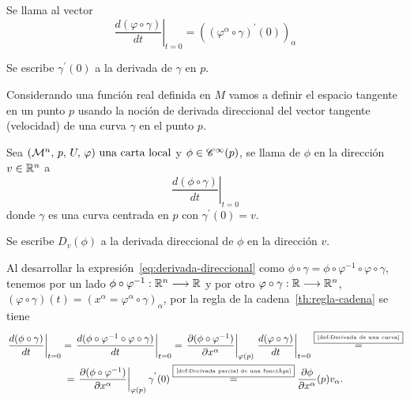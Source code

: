 \begin{definition}
  Se llama  al vector
  \begin{equation}
    \label{eq:derivada-curva}
    \left.\frac{d(\varphi\circ\gamma)
    }{dt}\right|_{t=0}=((\varphi^\alpha\circ\gamma)^{'}(0))_\alpha
  \end{equation}
\end{definition}
\begin{notation}
  Se escribe $\gamma^{'}(0)$ a la derivada de $\gamma$ en $p$.
\end{notation}

Considerando una función real definida en $M$ vamos a definir el espacio tangente en un
punto $p$ usando la noción de derivada direccional del vector tangente (velocidad) de una curva
$\gamma$ en el punto $p$.

\begin{definition}
  Sea $(\mathcal{M}^n,\thinspace p,\thinspace U,\thinspace \varphi)\textmd{ una carta local}$ y $\phi\in\mathscr{C}^\infty(p)$, se llama
   de $\phi$ en la dirección $v\in\mathbb{R}^n$ a
  \begin{equation}
    \label{eq:derivada-direccional}
    \left.\frac{d(\phi\circ\gamma)}{dt}\right|_{t=0}
  \end{equation}
  donde $\gamma$ es una curva centrada en $p$ con $\gamma^{'}(0)=v$.
\end{definition}
\begin{notation}
  Se escribe $D_v(\phi)$ a la derivada direccional de $\phi$ en la dirección $v$.
\end{notation}
Al desarrollar la expresión~\ref{eq:derivada-direccional} como
$\phi\circ\gamma=\phi\circ\varphi^{-1}\circ\varphi\circ\gamma$, tenemos por un lado
$\phi\circ\varphi^{-1}:\mathbb{R}^n\longrightarrow \mathbb{R}$
y por otro
$\varphi\circ\gamma:\mathbb{R}\longrightarrow \mathbb{R}^n$, $(\varphi\circ\gamma)(t)=
(x^\alpha=\varphi^\alpha\circ\gamma)_{\alpha}$,
por la regla de la cadena~\ref{th:regla-cadena} se tiene
\begin{multline}\label{eq:desarrollo-vector-tangente}
  \left.\frac{d(\phi\circ\gamma)}{dt}\right|_{t=0}=
  \left.\frac{d(\phi\circ\varphi^{-1}\circ\varphi\circ\gamma)}{dt}\right|_{t=0}=
  \left.\frac{\partial(\phi\circ\varphi^{-1})}{\partial x^\alpha}\right|_{\varphi(p)}
  \left.\frac{d(\varphi\circ\gamma)}{dt}\right|_{t=0}\overset{\fbox{\tiny \ref{def:Derivada de una curva}}}{=}\\
  =\left.\frac{\partial(\phi\circ\varphi^{-1})}{\partial x^\alpha}\right|_{\varphi(p)}
  \gamma^{'}(0)\overset{\fbox{\tiny \ref{def:Derivada parcial de una función}}}{=}
  \frac{\partial\phi}{\partial x^\alpha}(p) v_\alpha.
\end{multline}

